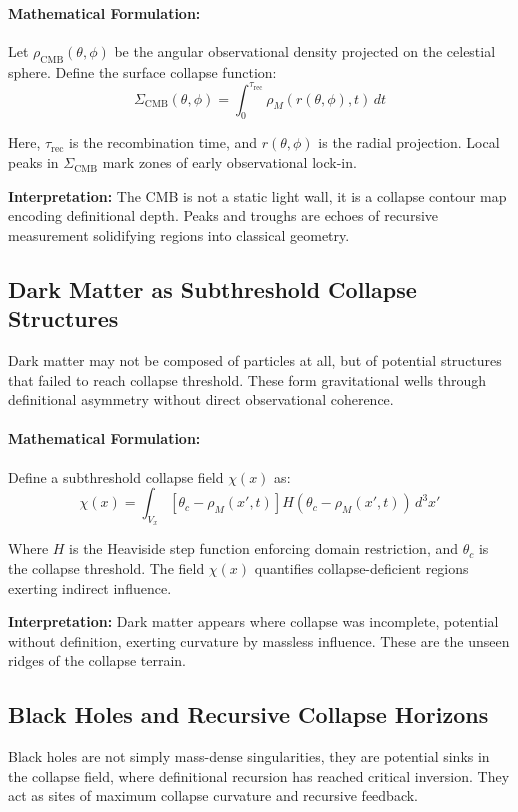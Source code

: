 \paragraph{Mathematical Formulation:}
Let $\rho_{\text{CMB}}(\theta, \phi)$ be the angular observational density projected on the celestial sphere. Define the surface collapse function:
\begin{equation}
\Sigma_{\text{CMB}}(\theta, \phi) = \int_0^{\tau_{\text{rec}}} \rho_M(r(\theta, \phi), t) \, dt
\end{equation}

Here, $\tau_{\text{rec}}$ is the recombination time, and $r(\theta, \phi)$ is the radial projection. Local peaks in $\Sigma_{\text{CMB}}$ mark zones of early observational lock-in.

\textbf{Interpretation:} The CMB is not a static light wall, it is a collapse contour map encoding definitional depth. Peaks and troughs are echoes of recursive measurement solidifying regions into classical geometry.

\subsection{Dark Matter as Subthreshold Collapse Structures}\cite{topology_geometry_core}
Dark matter may not be composed of particles at all, but of potential structures that failed to reach collapse threshold. These form gravitational wells through definitional asymmetry without direct observational coherence.

\paragraph{Mathematical Formulation:}
Define a subthreshold collapse field $\chi(x)$ as:
\begin{equation}
\chi(x) = \int_{V_x} \left[ \theta_c - \rho_M(x',t) \right] H(\theta_c - \rho_M(x',t)) \, d^3x'
\end{equation}

Where $H$ is the Heaviside step function enforcing domain restriction, and $\theta_c$ is the collapse threshold. The field $\chi(x)$ quantifies collapse-deficient regions exerting indirect influence.

\textbf{Interpretation:} Dark matter appears where collapse was incomplete, potential without definition, exerting curvature by massless influence. These are the unseen ridges of the collapse terrain.

\subsection{Black Holes and Recursive Collapse Horizons}
Black holes are not simply mass-dense singularities, they are potential sinks in the collapse field, where definitional recursion has reached critical inversion. They act as sites of maximum collapse curvature and recursive feedback.

